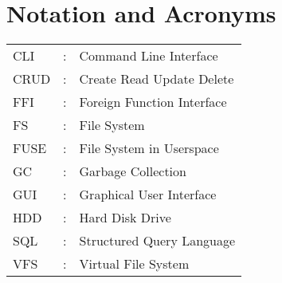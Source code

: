 \chapter*{Notation and Acronyms}
\vspace{1cm}

\noindent
\begin{tabular}{lcl}
    CLI &: & Command Line Interface \\
    CRUD &: & Create Read Update Delete \\
    FFI &: & Foreign Function Interface \\
    FS &: & File System \\
    FUSE &: & File System in Userspace \\
    GC &: & Garbage Collection \\
    GUI &: & Graphical User Interface \\
    HDD &: & Hard Disk Drive \\
    SQL &: & Structured Query Language \\
    VFS &: & Virtual File System \\
\end{tabular}
